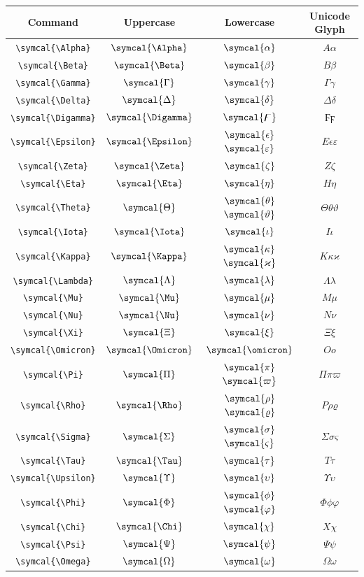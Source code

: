 \documentclass[12pt,a4paper]{article}
\begin{document}
\begin{longtable}{|c|c|c|c|}
\hline
\textbf{Command} & \textbf{Uppercase} & \textbf{Lowercase} & \textbf{Unicode Glyph} \\
\hline
\verb|\symcal{\Alpha}| & $\symcal{\Alpha}$ & $\symcal{\alpha}$ & $ Α 𝛼 $ \\
\verb|\symcal{\Beta}| & $\symcal{\Beta}$ & $\symcal{\beta}$ & $ Β 𝛽 $ \\
\verb|\symcal{\Gamma}| & $\symcal{\Gamma}$ & $\symcal{\gamma}$ & $ Γ 𝛾 $ \\
\verb|\symcal{\Delta}| & $\symcal{\Delta}$ & $\symcal{\delta}$ & $ Δ 𝛿 $ \\
\verb|\symcal{\Digamma}| & $\symcal{\Digamma}$ & $\symcal{\digamma}$ & $ Ϝ ϝ $ \\
\verb|\symcal{\Epsilon}| & $\symcal{\Epsilon}$ & $\symcal{\epsilon}$ $\symcal{\varepsilon}$ & $ Ε 𝜖 𝜀 $ \\
\verb|\symcal{\Zeta}| & $\symcal{\Zeta}$ & $\symcal{\zeta}$ & $ Ζ 𝜁 $ \\
\verb|\symcal{\Eta}| & $\symcal{\Eta}$ & $\symcal{\eta}$ & $ Η 𝜂 $ \\
\verb|\symcal{\Theta}| & $\symcal{\Theta}$ & $\symcal{\theta}$ $\symcal{\vartheta}$ & $ Θ 𝜃 𝜗 $ \\
\verb|\symcal{\Iota}| & $\symcal{\Iota}$ & $\symcal{\iota}$ & $ Ι 𝜄 $ \\
\verb|\symcal{\Kappa}| & $\symcal{\Kappa}$ & $\symcal{\kappa}$ $\symcal{\varkappa}$ & $ Κ 𝜅 𝜘 $ \\
\verb|\symcal{\Lambda}| & $\symcal{\Lambda}$ & $\symcal{\lambda}$ & $ Λ 𝜆 $ \\
\verb|\symcal{\Mu}| & $\symcal{\Mu}$ & $\symcal{\mu}$ & $ Μ 𝜇 $ \\
\verb|\symcal{\Nu}| & $\symcal{\Nu}$ & $\symcal{\nu}$ & $ Ν 𝜈 $ \\
\verb|\symcal{\Xi}| & $\symcal{\Xi}$ & $\symcal{\xi}$ & $ Ξ 𝜉 $ \\
\verb|\symcal{\Omicron}| & $\symcal{\Omicron}$ & $\symcal{\omicron}$ & $ Ο 𝜊 $ \\
\verb|\symcal{\Pi}| & $\symcal{\Pi}$ & $\symcal{\pi}$ $\symcal{\varpi}$ & $ Π 𝜋 𝜛 $ \\
\verb|\symcal{\Rho}| & $\symcal{\Rho}$ & $\symcal{\rho}$ $\symcal{\varrho}$ & $ Ρ 𝜌 𝜚 $ \\
\verb|\symcal{\Sigma}| & $\symcal{\Sigma}$ & $\symcal{\sigma}$ $\symcal{\varsigma}$ & $ Σ 𝜎 𝜍 $ \\
\verb|\symcal{\Tau}| & $\symcal{\Tau}$ & $\symcal{\tau}$ & $ Τ 𝜏 $ \\
\verb|\symcal{\Upsilon}| & $\symcal{\Upsilon}$ & $\symcal{\upsilon}$ & $ Υ 𝜐 $ \\
\verb|\symcal{\Phi}| & $\symcal{\Phi}$ & $\symcal{\phi}$ $\symcal{\varphi}$ & $ Φ 𝜙 𝜑 $ \\
\verb|\symcal{\Chi}| & $\symcal{\Chi}$ & $\symcal{\chi}$ & $ Χ 𝜒 $ \\
\verb|\symcal{\Psi}| & $\symcal{\Psi}$ & $\symcal{\psi}$ & $ Ψ 𝜓 $ \\
\verb|\symcal{\Omega}| & $\symcal{\Omega}$ & $\symcal{\omega}$ & $ Ω 𝜔 $ \\
\hline
\end{longtable}
\end{document}
